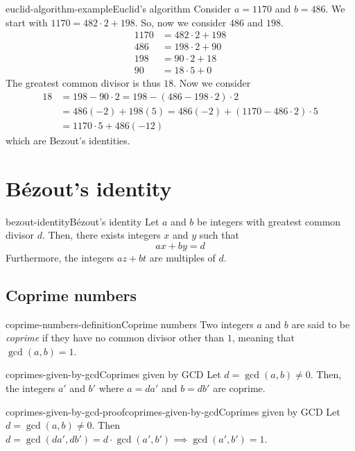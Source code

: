 \documentclass[preview]{standalone}
\begin{document}
\begin{snippetexample}{euclid-algorithm-example}{Euclid's algorithm}
    Consider \(a=1170\) and \(b=486\).
    We start with
    \(1170 = 482 \cdot 2 + 198\). So, now we consider \(486\) and \(198\).
    \begin{align*}
        1170 &= 482 \cdot 2 + 198 \\
        486 &= 198 \cdot 2 + 90 \\
        198 &= 90 \cdot 2 + 18 \\
        90 &= 18 \cdot 5 + 0
    \end{align*}
    The greatest common divisor is thus \(18\).
    Now we consider
    \begin{align*}
        18 &= 198 - 90\cdot 2 = 198 - (486 - 198 \cdot 2)\cdot 2 \\
        &= 486(-2) + 198(5) = 486(-2) + (1170 - 486\cdot 2) \cdot 5 \\
        &= 1170 \cdot 5 + 486(-12)
    \end{align*}
    which are Bezout's identities.
\end{snippetexample}

\section{Bézout's identity}

\begin{snippettheorem}{bezout-identity}{Bézout's identity}
    Let \(a\) and \(b\) be integers with greatest common divisor \(d\).
    Then, there exists integers \(x\) and \(y\) such that
    \[
        ax+by=d
    \]
    Furthermore, the integers \(az+bt\) are multiples of \(d\).
\end{snippettheorem}


\subsection{Coprime numbers}

\begin{snippetdefinition}{coprime-numbers-definition}{Coprime numbers}
    Two integers \(a\) and \(b\) are said to be \textit{coprime}
    if they have no common divisor other than \(1\), meaning that \(\gcd(a,b)=1\).
\end{snippetdefinition}

\begin{snippetproposition}{coprimes-given-by-gcd}{Coprimes given by GCD}
    Let \(d = \gcd(a, b) \neq 0\). Then, the integers \(a'\) and \(b'\) where \(a = da'\) and \(b = db'\)
    are coprime.
\end{snippetproposition}

\begin{snippetproof}{coprimes-given-by-gcd-proof}{coprimes-given-by-gcd}{Coprimes given by GCD}
    Let \(d = \gcd(a, b) \neq 0\). Then \(d = \gcd(da', db') = d\cdot \gcd(a', b') \implies \gcd(a', b') = 1\).
\end{snippetproof}


\end{document}
